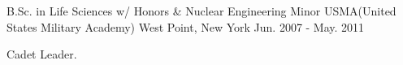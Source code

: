 


\begin{cventries}

  \cventry
    {B.Sc. in Life Sciences w/ Honors & Nuclear Engineering Minor} %
    {USMA(United States Military Academy)} %
    {West Point, New York} %
    {Jun. 2007 - May. 2011} %
    {
      \begin{cvitems} %
        \item {Cadet Leader.}
      \end{cvitems}
    }

\end{cventries}
